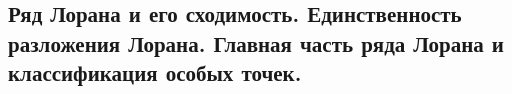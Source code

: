 \subsection{Ряд Лорана и его сходимость. Единственность разложения Лорана. Главная часть ряда Лорана и классификация особых точек.}